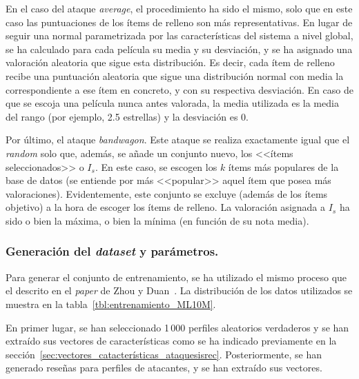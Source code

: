 En el caso del ataque \textit{average}, el procedimiento ha sido el mismo, solo que en este caso las puntuaciones de los ítems de relleno son más representativas. En lugar de seguir una normal parametrizada por las características del sistema a nivel global, se ha calculado para cada película su media y su desviación, y se ha asignado una valoración aleatoria que sigue esta distribución. Es decir, cada ítem de relleno recibe una puntuación aleatoria que sigue una distribución normal con media la correspondiente a ese ítem en concreto, y con su respectiva desviación. En caso de que se escoja una película nunca antes valorada, la media utilizada es la media del rango (por ejemplo, 2.5 estrellas) y la desviación es $0$.

Por último, el ataque \textit{bandwagon}. Este ataque se realiza exactamente igual que el \textit{random} solo que, además, se añade un conjunto nuevo, los <<ítems seleccionados>> o $I_s$. En este caso, se escogen los $k$ ítems más populares de la base de datos (se entiende por más <<popular>> aquel ítem que posea más valoraciones). Evidentemente, este conjunto se excluye (además de los ítems objetivo) a la hora de escoger los ítems de relleno. La valoración asignada a $I_s$ ha sido o bien la máxima, o bien la mínima (en función de su nota media).

\subsubsection{Generación del \textit{dataset} y parámetros.}

Para generar el conjunto de entrenamiento, se ha utilizado el mismo proceso que el descrito en el \textit{paper} de Zhou y Duan~\cite{zhou2021SemisupervisedRecommendationAttack}. La distribución de los datos utilizados se muestra en la tabla~\ref{tbl:entrenamiento_ML10M}.

En primer lugar, se han seleccionado 1\,000 perfiles aleatorios verdaderos y se han extraído sus vectores de características como se ha indicado previamente en la sección~\ref{sec:vectores_catacterísticas_ataquesisrec}. Posteriormente, se han generado reseñas para perfiles de atacantes, y se han extraído sus vectores.

